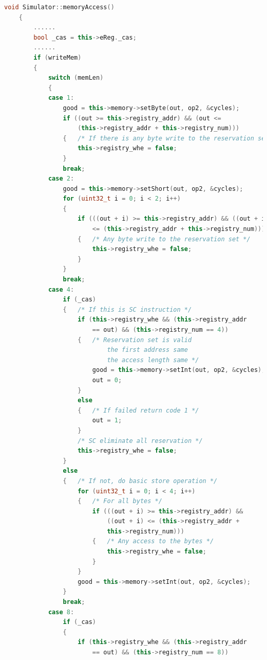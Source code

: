 \documentclass{article}
\begin{document}
\begin{lstlisting}[language=c++]
    void Simulator::memoryAccess()
    {
        ......
        bool _cas = this->eReg._cas;
        ......
        if (writeMem)
        {
            switch (memLen)
            {
            case 1:
                good = this->memory->setByte(out, op2, &cycles);
                if ((out >= this->registry_addr) && (out <=
                    (this->registry_addr + this->registry_num))) 
                {   /* If there is any byte write to the reservation set */
                    this->registry_whe = false;
                }
                break;
            case 2:
                good = this->memory->setShort(out, op2, &cycles);
                for (uint32_t i = 0; i < 2; i++) 
                {
                    if (((out + i) >= this->registry_addr) && ((out + i) 
                        <= (this->registry_addr + this->registry_num)))
                    {   /* Any byte write to the reservation set */
                        this->registry_whe = false;
                    }
                }
                break;
            case 4:
                if (_cas)
                {   /* If this is SC instruction */
                    if (this->registry_whe && (this->registry_addr 
                        == out) && (this->registry_num == 4))
                    {   /* Reservation set is valid 
                            the first address same
                            the access length same */
                        good = this->memory->setInt(out, op2, &cycles);
                        out = 0;
                    }
                    else
                    {   /* If failed return code 1 */
                        out = 1;
                    }
                    /* SC eliminate all reservation */
                    this->registry_whe = false;
                }
                else
                {   /* If not, do basic store operation */
                    for (uint32_t i = 0; i < 4; i++) 
                    {   /* For all bytes */
                        if (((out + i) >= this->registry_addr) && 
                            ((out + i) <= (this->registry_addr +
                            this->registry_num)))
                        {   /* Any access to the bytes */
                            this->registry_whe = false;
                        }
                    }
                    good = this->memory->setInt(out, op2, &cycles);
                }
                break;
            case 8:
                if (_cas)
                {
                    if (this->registry_whe && (this->registry_addr 
                        == out) && (this->registry_num == 8))

\end{lstlisting}
\end{document}

